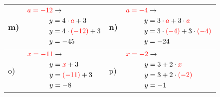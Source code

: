 \documentclass[12pt]{article}
\begin{document}
\begin{xltabular}{\textwidth}{|C{0.75cm}|X|C{0.75cm}|X|}
\\\hline
m)&$\begin{aligned}
\textcolor{red}{a=-12} & \rightarrow\\
y&=4 \cdot \textcolor{red}{a} + 3\\
y&=4 \cdot \textcolor{red}{(-12)} + 3\\
y&=-45\\
\end{aligned}$
&
n)&$\begin{aligned}
\textcolor{red}{a=-4} & \rightarrow\\
y&=3 \cdot \textcolor{red}{a} + 3 \cdot \textcolor{red}{a}\\
y&=3 \cdot \textcolor{red}{(-4)} + 3 \cdot \textcolor{red}{(-4)}\\
y&=-24\\
\end{aligned}$
\\\hline
o)&$\begin{aligned}
\textcolor{red}{x=-11} & \rightarrow\\
y&=\textcolor{red}{x} + 3\\
y&=\textcolor{red}{(-11)} + 3\\
y&=-8\\
\end{aligned}$
&
p)&$\begin{aligned}
\textcolor{red}{x=-2} & \rightarrow\\
y&=3 + 2 \cdot \textcolor{red}{x}\\
y&=3 + 2 \cdot \textcolor{red}{(-2)}\\
y&=-1\\
\end{aligned}$
\\\hline
\end{xltabular}
\vspace{0.5cm}
\end{document}
